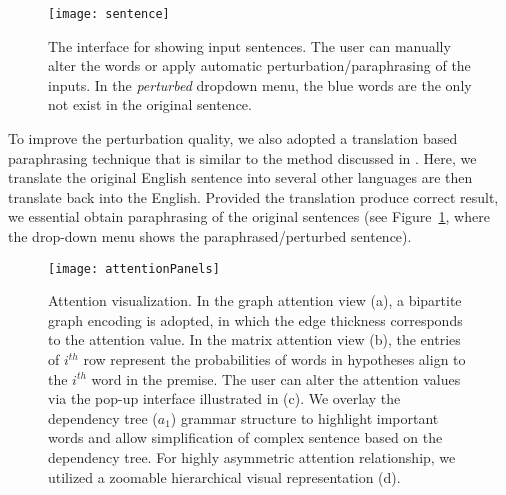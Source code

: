 \begin{figure}[htbp]
\centering
\vspace{-2mm}
 \texttt{[image: sentence]}
 \caption{
The interface for showing input sentences. The user can manually alter the words or apply automatic perturbation/paraphrasing of the inputs. In the \emph{perturbed} dropdown menu, the blue words are the only not exist in the original sentence.
 }
\label{fig:sentence}
\end{figure}

To improve the perturbation quality, we also adopted a translation based paraphrasing technique that is similar to the method discussed in \cite{mallinson2017paraphrasing}. Here, we translate the original English sentence into several other languages are then translate back into the English. Provided the translation produce correct result, we essential obtain paraphrasing of the original sentences (see Figure~\ref{fig:sentence}, where the drop-down menu shows the paraphrased/perturbed sentence).


\begin{figure*}[t]
\centering
\vspace{-2mm}
 \texttt{[image: attentionPanels]}
  \vspace{-6mm}
 \caption{
Attention visualization. In the graph attention view (a), a bipartite graph encoding is adopted, in which the edge thickness corresponds to the attention value. In the matrix attention view (b), the entries of $i^{th}$ row represent the probabilities of words in hypotheses align to the $i^{th}$ word in the premise.
The user can alter the attention values via the pop-up interface illustrated in (c).
We overlay the dependency tree ($a_1$) grammar structure to highlight important words and allow simplification of complex sentence based on the dependency tree.
%
For highly asymmetric attention relationship, we utilized a zoomable hierarchical visual representation (d).
}
\label{fig:attentionVis}
\end{figure*}

